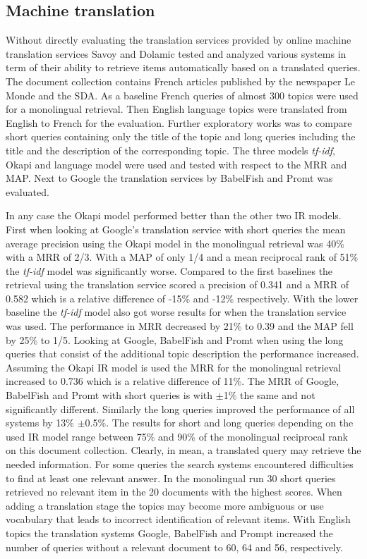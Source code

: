 \documentclass[journal]{IEEEtran}
\begin{document}
\subsection{Machine translation}
Without directly evaluating the translation services provided by online machine translation services Savoy and Dolamic \cite{savoy09} tested and analyzed various systems in term of their ability to retrieve items automatically based on a translated queries.
The document collection contains French articles published by the newspaper Le Monde and the SDA.
As a baseline French queries of almost 300 topics were used for a monolingual retrieval.
Then English language topics were translated from English to French for the evaluation.
Further exploratory works was to compare short queries containing only the title of the topic and long queries including the title and the description of the corresponding topic.
The three models \textit{tf-idf}, Okapi and language model were used and tested with respect to the MRR and MAP.
Next to Google the translation services by BabelFish and Promt was evaluated.

In any case the Okapi model performed better than the other two IR models.
First when looking at Google's translation service with short queries the mean average precision using the Okapi model in the monolingual retrieval was 40\% with a MRR of 2/3.
With a MAP of only 1/4 and a mean reciprocal rank of 51\% the \textit{tf-idf} model was significantly worse.
Compared to the first baselines the retrieval using the translation service scored a precision of 0.341 and a MRR of 0.582 which is a relative difference of -15\% and -12\% respectively.
With the lower baseline the \textit{tf-idf} model also got worse results for when the translation service was used.
The performance in MRR decreased by 21\% to 0.39 and the MAP fell by 25\% to 1/5.
Looking at Google, BabelFish and Promt when using the long queries that consist of the additional topic description the performance increased.
Assuming the Okapi IR model is used the MRR for the monolingual retrieval increased to 0.736 which is a relative difference of 11\%.
The MRR of Google, BabelFish and Promt with short queries is with $\pm$1\% the same and not significantly different.
Similarly the long queries improved the performance of all systems by 13\% $\pm$0.5\%.
The results for short and long queries depending on the used IR model range between 75\% and 90\% of the monolingual reciprocal rank on this document collection.
Clearly, in mean, a translated query may retrieve the needed information.
For some queries the search systems encountered difficulties to find at least one relevant answer.
In the monolingual run 30 short queries retrieved no relevant item in the 20 documents with the highest scores.
When adding a translation stage the topics may become more ambiguous or use vocabulary that leads to incorrect identification of relevant items.
With English topics the translation systems Google, BabelFish and Prompt increased the number of queries without a relevant document to 60, 64 and 56, respectively.
\end{document}
